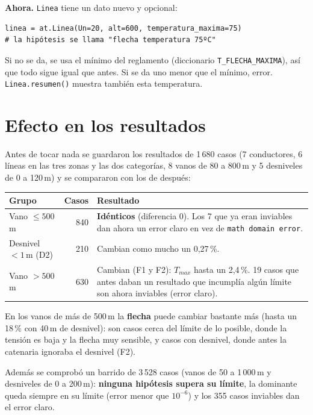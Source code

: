 \documentclass[11pt,a4paper]{article}
\newcommand{\code}[1]{\texttt{#1}}
\newcommand{\ahora}[1]{\noindent\textcolor{ahora}{\textbf{Ahora.}} #1\par\smallskip}
\begin{document}
\ahora{\code{Linea} tiene un dato nuevo y opcional:}

\begin{lstlisting}
linea = at.Linea(Un=20, alt=600, temperatura_maxima=75)
# la hipótesis se llama "flecha temperatura 75ºC"
\end{lstlisting}

Si no se da, se usa el mínimo del reglamento (diccionario \code{T\_FLECHA\_MAXIMA}), así que todo sigue igual que antes. Si se da uno menor que el mínimo, error. \code{Linea.resumen()} muestra también esta temperatura.

\section{Efecto en los resultados}

Antes de tocar nada se guardaron los resultados de 1\,680 casos (7 conductores, 6 líneas en las tres zonas y las dos categorías, 8 vanos de 80 a 800\,m y 5 desniveles de 0 a 120\,m) y se compararon con los de después:

\begin{center}
\begin{tabular}{lrp{8.2cm}}
\toprule
\textbf{Grupo} & \textbf{Casos} & \textbf{Resultado} \\
\midrule
Vano $\le 500$\,m      & 840 & \textbf{Idénticos} (diferencia 0). Los 7 que ya eran inviables dan ahora un error claro en vez de \code{math domain error}. \\
Desnivel $<1$\,m (D2)  & 210 & Cambian como mucho un 0,27\,\%. \\
Vano $> 500$\,m        & 630 & Cambian (F1 y F2): $T_{max}$ hasta un 2,4\,\%. 19 casos que antes daban un resultado que incumplía algún límite son ahora inviables (error claro). \\
\bottomrule
\end{tabular}
\end{center}

En los vanos de más de 500\,m la \textbf{flecha} puede cambiar bastante más (hasta un 18\,\% con 40\,m de desnivel): son casos cerca del límite de lo posible, donde la tensión es baja y la flecha muy sensible, y casos con desnivel, donde antes la catenaria ignoraba el desnivel (F2).

Además se comprobó un barrido de 3\,528 casos (vanos de 50 a 1\,000\,m y desniveles de 0 a 200\,m): \textbf{ninguna hipótesis supera su límite}, la dominante queda siempre en su límite (error menor que $10^{-6}$) y los 355 casos inviables dan el error claro.
\end{document}
